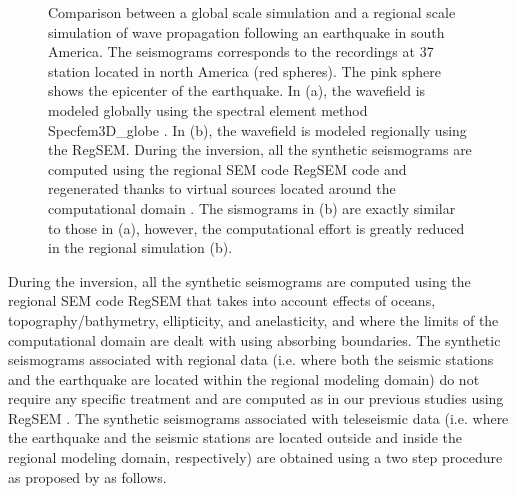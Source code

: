 \documentclass[12pt]{article}
\begin{document}
\begin{figure}[p]
	\caption{\baselineskip 18pt 
		Comparison between a global scale simulation and a regional scale simulation of wave propagation following an earthquake in south America. The seismograms corresponds to the recordings at 37 station located in north America (red spheres).
		The pink sphere shows the epicenter of the earthquake. In (a), the wavefield is modeled globally using the spectral element method Specfem3D\_globe \citep{komatitsch2002spectrala}. In (b), the wavefield is modeled regionally using the RegSEM. During the inversion, all the synthetic seismograms are computed using the regional SEM code RegSEM \citep{cupillard2012regsem} code and regenerated thanks to virtual sources located around the computational domain \citep[see][]{masson2013numerical}. The sismograms in (b) are exactly similar to those in (a), however, the computational effort is greatly reduced in the regional simulation (b).}

	\label{injection}

\end{figure}

During the inversion, all the synthetic seismograms are computed using the regional SEM code RegSEM \citep{cupillard2012regsem} that takes into account effects of oceans, topography/bathymetry, ellipticity, and anelasticity, and where the limits of the computational domain are dealt with using absorbing boundaries. 
The synthetic seismograms associated with regional data (i.e. where both the seismic stations and the earthquake are located within the regional modeling domain) do not require any specific treatment and are computed as in our previous studies using RegSEM \citep[e.g.][]{yuan2014lithospheric}. 
The synthetic seismograms associated with teleseismic data (i.e. where the earthquake and the seismic stations are located outside and inside the regional modeling domain, respectively) are obtained using a two step procedure as proposed by \cite{masson2016box} as follows. 
\end{document}
